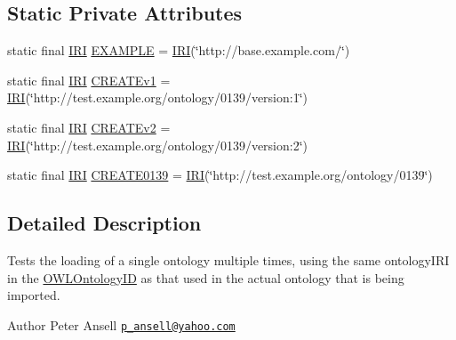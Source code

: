 \subsection*{Static Private Attributes}
\begin{DoxyCompactItemize}
\item 
static final \hyperlink{classorg_1_1semanticweb_1_1owlapi_1_1model_1_1_i_r_i}{I\-R\-I} \hyperlink{classorg_1_1semanticweb_1_1owlapi_1_1api_1_1test_1_1syntax_1_1rdfxml_1_1_multiple_ontology_loads_test_adebf11134882e6b1e0664c8597f497ca}{E\-X\-A\-M\-P\-L\-E} = \hyperlink{classorg_1_1semanticweb_1_1owlapi_1_1model_1_1_i_r_i}{I\-R\-I}(\char`\"{}http\-://base.\-example.\-com/\char`\"{})
\item 
static final \hyperlink{classorg_1_1semanticweb_1_1owlapi_1_1model_1_1_i_r_i}{I\-R\-I} \hyperlink{classorg_1_1semanticweb_1_1owlapi_1_1api_1_1test_1_1syntax_1_1rdfxml_1_1_multiple_ontology_loads_test_a06c49873617d6092a26a5484abb90993}{C\-R\-E\-A\-T\-Ev1} = \hyperlink{classorg_1_1semanticweb_1_1owlapi_1_1model_1_1_i_r_i}{I\-R\-I}(\char`\"{}http\-://test.\-example.\-org/ontology/0139/version\-:1\char`\"{})
\item 
static final \hyperlink{classorg_1_1semanticweb_1_1owlapi_1_1model_1_1_i_r_i}{I\-R\-I} \hyperlink{classorg_1_1semanticweb_1_1owlapi_1_1api_1_1test_1_1syntax_1_1rdfxml_1_1_multiple_ontology_loads_test_aee1e695b3d2dc6d97bc1381e15525cd4}{C\-R\-E\-A\-T\-Ev2} = \hyperlink{classorg_1_1semanticweb_1_1owlapi_1_1model_1_1_i_r_i}{I\-R\-I}(\char`\"{}http\-://test.\-example.\-org/ontology/0139/version\-:2\char`\"{})
\item 
static final \hyperlink{classorg_1_1semanticweb_1_1owlapi_1_1model_1_1_i_r_i}{I\-R\-I} \hyperlink{classorg_1_1semanticweb_1_1owlapi_1_1api_1_1test_1_1syntax_1_1rdfxml_1_1_multiple_ontology_loads_test_a37fc8ba37e3edd65ea7c99244a808edf}{C\-R\-E\-A\-T\-E0139} = \hyperlink{classorg_1_1semanticweb_1_1owlapi_1_1model_1_1_i_r_i}{I\-R\-I}(\char`\"{}http\-://test.\-example.\-org/ontology/0139\char`\"{})
\end{DoxyCompactItemize}


\subsection{Detailed Description}
Tests the loading of a single ontology multiple times, using the same ontology\-I\-R\-I in the \hyperlink{}{O\-W\-L\-Ontology\-I\-D} as that used in the actual ontology that is being imported.

\begin{DoxyAuthor}{Author}
Peter Ansell \href{mailto:p_ansell@yahoo.com}{\tt p\-\_\-ansell@yahoo.\-com} 
\end{DoxyAuthor}


